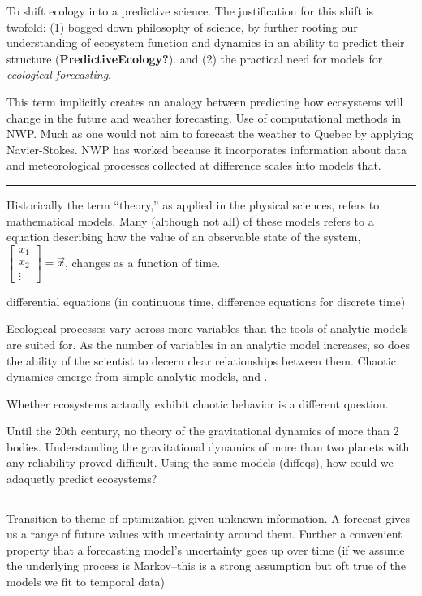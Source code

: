 \documentclass[10pt,oneside]{article}
\begin{document}
To shift ecology into a predictive science. The justification for this
shift is twofold: (1) bogged down philosophy of science, by further
rooting our understanding of ecosystem function and dynamics in an
ability to predict their structure (\textbf{PredictiveEcology?}). and
(2) the practical need for models for \emph{ecological forecasting}.

This term implicitly creates an analogy between predicting how
ecosystems will change in the future and weather forecasting. Use of
computational methods in NWP. Much as one would not aim to forecast the
weather to Quebec by applying Navier-Stokes. NWP has worked because it
incorporates information about data and meteorological processes
collected at difference scales into models that.

\begin{center}\rule{0.5\linewidth}{0.5pt}\end{center}

Historically the term ``theory,'' as applied in the physical sciences,
refers to mathematical models. Many (although not all) of these models
refers to a equation describing how the value of an observable state of
the system,
\(\begin{bmatrix}x_1 \\ x_2 \\ \vdots \end{bmatrix} = \vec{x}\), changes
as a function of time.

differential equations (in continuous time, difference equations for
discrete time)

Ecological processes vary across more variables than the tools of
analytic models are suited for. As the number of variables in an
analytic model increases, so does the ability of the scientist to decern
clear relationships between them. Chaotic dynamics emerge from simple
analytic models, and .

Whether ecosystems actually exhibit chaotic behavior is a different
question.

Until the 20th century, no theory of the gravitational dynamics of more
than 2 bodies. Understanding the gravitational dynamics of more than two
planets with any reliability proved difficult. Using the same models
(diffeqs), how could we adaquetly predict ecosystems?

\begin{center}\rule{0.5\linewidth}{0.5pt}\end{center}

Transition to theme of optimization given unknown information. A
forecast gives us a range of future values with uncertainty around them.
Further a convenient property that a forecasting model's uncertainty
goes up over time (if we assume the underlying process is Markov--this
is a strong assumption but oft true of the models we fit to temporal
data)
\end{document}
